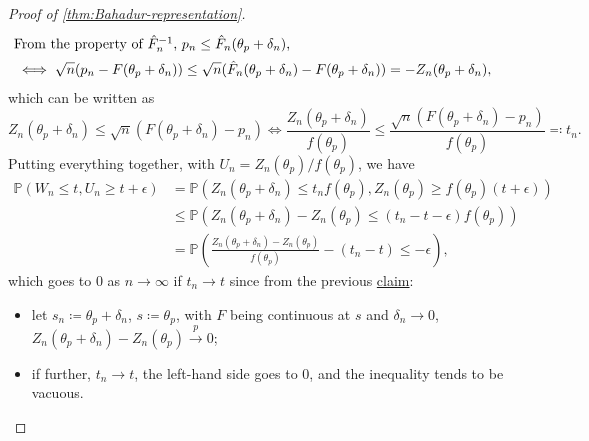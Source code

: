 \begin{proof}[Proof of \autoref{thm:Bahadur-representation}]
\begin{align*}
		\shortintertext{From the property of \(\hat{F} _n ^{-1} \), \(p_n \leq \hat{F} _n(\theta _p + \delta _n)\),}
		 & \iff \sqrt{n} (p_n - F(\theta _p + \delta _n)) \leq \sqrt{n} (\hat{F} _n(\theta _p + \delta _n) - F(\theta _p + \delta _n)) = -Z_n(\theta _p + \delta _n),
	\end{align*}
	which can be written as
	\[
		Z_n(\theta _p + \delta _n) \leq \sqrt{n} (F(\theta _p + \delta _n) - p_n)
		\iff  \frac{Z_n(\theta _p + \delta _n)}{f(\theta _p)} \leq \frac{\sqrt{n} (F(\theta _p + \delta _n) - p_n)}{f(\theta _p)} \eqqcolon t_n .
	\]
	Putting everything together, with \(U_n = Z_n(\theta _p) / f(\theta _p)\), we have
	\[
		\begin{split}
			\mathbb{P} (W_n \leq t, U_n \geq t + \epsilon )
			 & = \mathbb{P} (Z_n(\theta _p + \delta _n) \leq t_n f(\theta _p) , Z_n(\theta _p) \geq f(\theta _p) (t + \epsilon ))        \\
			 & \leq \mathbb{P} (Z_n(\theta _p + \delta _n) - Z_n(\theta _p) \leq (t_n - t - \epsilon ) f(\theta _p))                     \\
			 & = \mathbb{P} \left( \frac{Z_n(\theta _p + \delta _n) - Z_n(\theta _p)}{f(\theta _p)} - (t_n - t) \leq -\epsilon \right) ,
		\end{split}
	\]
	which goes to \(0\) as \(n \to \infty \) if \(t_n \to t\) since from the previous \hyperref[clm:pf:Bahadur-representation]{claim}:
	\begin{itemize}
		\item let \(s_n \coloneqq \theta _p + \delta _n\), \(s \coloneqq \theta _p\), with \(F\) being continuous at \(s\) and \(\delta _n \to 0\), \(Z_n(\theta _p + \delta _n) - Z_n(\theta _p) \overset{p}{\to} 0\);
		\item if further, \(t_n \to t\), the left-hand side goes to \(0\), and the inequality tends to be vacuous.
	\end{itemize}


\end{proof}
